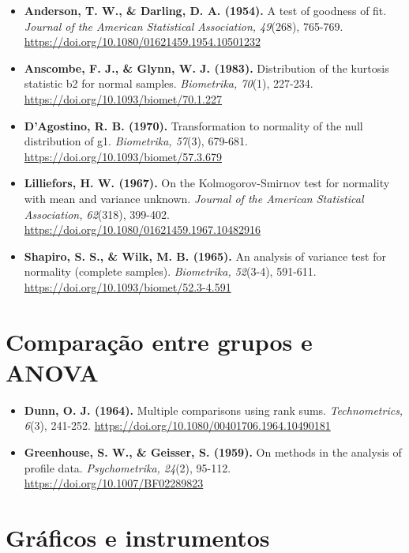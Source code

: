 \documentclass[
]{book}
\begin{document}
\begin{itemize}
\item
  \textbf{Anderson, T. W., \& Darling, D. A. (1954).} A test of goodness of fit. \emph{Journal of the American Statistical Association, 49}(268), 765-769. \url{https://doi.org/10.1080/01621459.1954.10501232}
\item
  \textbf{Anscombe, F. J., \& Glynn, W. J. (1983).} Distribution of the kurtosis statistic b2 for normal samples. \emph{Biometrika, 70}(1), 227-234. \url{https://doi.org/10.1093/biomet/70.1.227}
\item
  \textbf{D'Agostino, R. B. (1970).} Transformation to normality of the null distribution of g1. \emph{Biometrika, 57}(3), 679-681. \url{https://doi.org/10.1093/biomet/57.3.679}
\item
  \textbf{Lilliefors, H. W. (1967).} On the Kolmogorov-Smirnov test for normality with mean and variance unknown. \emph{Journal of the American Statistical Association, 62}(318), 399-402. \url{https://doi.org/10.1080/01621459.1967.10482916}
\item
  \textbf{Shapiro, S. S., \& Wilk, M. B. (1965).} An analysis of variance test for normality (complete samples). \emph{Biometrika, 52}(3-4), 591-611. \url{https://doi.org/10.1093/biomet/52.3-4.591}
\end{itemize}

\section*{Comparação entre grupos e ANOVA}\label{comparauxe7uxe3o-entre-grupos-e-anova}

\begin{itemize}
\item
  \textbf{Dunn, O. J. (1964).} Multiple comparisons using rank sums. \emph{Technometrics, 6}(3), 241-252. \url{https://doi.org/10.1080/00401706.1964.10490181}
\item
  \textbf{Greenhouse, S. W., \& Geisser, S. (1959).} On methods in the analysis of profile data. \emph{Psychometrika, 24}(2), 95-112. \url{https://doi.org/10.1007/BF02289823}
\end{itemize}

\section*{Gráficos e instrumentos}\label{gruxe1ficos-e-instrumentos}
\end{document}
